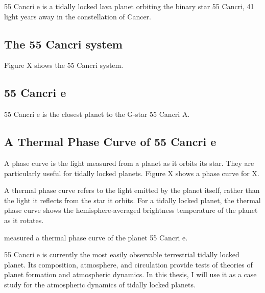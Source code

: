 55 Cancri e is a tidally locked lava planet orbiting the binary star 55 Cancri, 41 light years away in the constellation of Cancer.

\subsection*{The 55 Cancri system}

Figure X shows the 55 Cancri system.

\subsection*{55 Cancri e}

55 Cancri e is the closest planet to the G-star 55 Cancri A.

\subsection*{A Thermal Phase Curve of 55 Cancri e}

A phase curve is the light measured from a planet as it orbits its star. They are particularly useful for tidally locked planets. Figure X shows a phase curve for X.

A thermal phase curve refers to the light emitted by the planet itself, rather than the light it reflects from the star it orbits. For a tidally locked planet, the thermal phase curve shows the hemisphere-averaged brightness temperature of the planet as it rotates.

\citet{demory201655cnce} measured a thermal phase curve of the planet 55 Cancri e.




55 Cancri e is currently the most easily observable terrestrial tidally locked planet. Its composition, atmosphere, and circulation provide tests of theories of planet formation and atmospheric dynamics. In this thesis, I will use it as a case study for the atmospheric dynamics of tidally locked planets.



% 
% 
